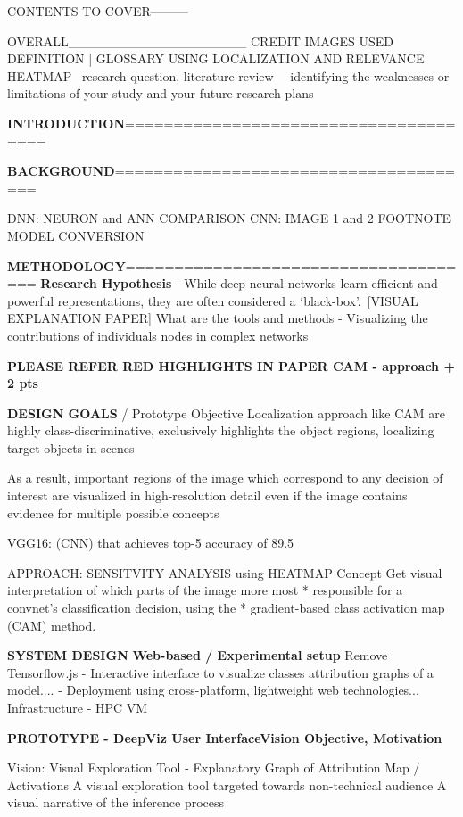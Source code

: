 CONTENTS TO COVER---------

OVERALL___________________
CREDIT IMAGES USED
DEFINITION | GLOSSARY
USING LOCALIZATION AND RELEVANCE HEATMAP
 research question, literature review 
 identifying the weaknesses or limitations of your study and your future research plans

\textbf{INTRODUCTION}======================================

\textbf{BACKGROUND}======================================

DNN: NEURON  and ANN COMPARISON
CNN: IMAGE 1 and 2 FOOTNOTE
MODEL CONVERSION

\textbf{METHODOLOGY}=====================================
\textbf{Research Hypothesis}
- While deep neural networks learn efficient and powerful representations, they are often considered a ‘black-box’. [VISUAL EXPLANATION PAPER] What are the tools and methods 
- Visualizing the contributions of individuals nodes in complex networks

\textbf{PLEASE REFER RED HIGHLIGHTS IN PAPER CAM - approach + 2 pts}

\textbf{DESIGN GOALS} / Prototype Objective
Localization approach like CAM are highly class-discriminative, exclusively highlights the object regions, localizing target objects in scenes

As a result, important regions of the image which correspond
to any decision of interest are visualized in high-resolution
detail even if the image contains evidence for multiple possible concepts

VGG16: (CNN) that achieves top-5 accuracy of 89.5%

APPROACH: SENSITVITY ANALYSIS using HEATMAP Concept
Get visual interpretation of which parts of the image more most
 *    responsible for a convnet's classification decision, using the
 *    gradient-based class activation map (CAM) method.
 
 \textbf{SYSTEM DESIGN}
 \textbf{Web-based / Experimental setup}
 Remove Tensorflow.js
 - Interactive interface to visualize classes attribution graphs of a model....
 - Deployment using cross-platform, lightweight web technologies...
Infrastructure - HPC VM

 \textbf{PROTOTYPE - DeepViz User InterfaceVision Objective, Motivation}

Vision:  Visual Exploration Tool - Explanatory Graph of Attribution Map / Activations
A visual exploration tool targeted towards non-technical audience
A visual narrative of the inference process


